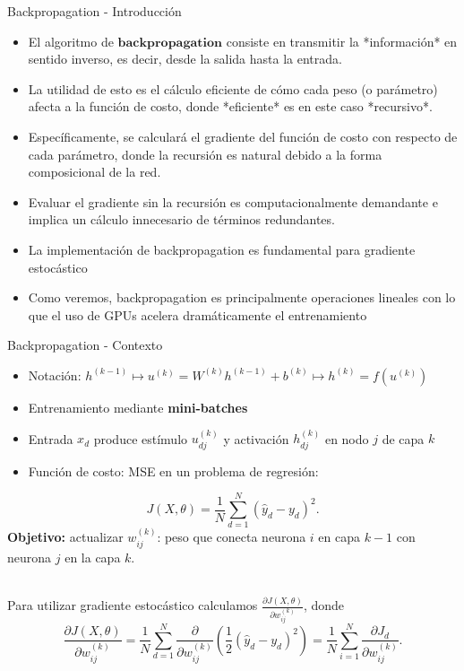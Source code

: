 \documentclass[handout, 9pt]{beamer}
\begin{document}
\begin{frame}{Backpropagation - Introducción}
\begin{itemize}
  \item El algoritmo de $\textbf{backpropagation}$ consiste en transmitir la *información* en sentido inverso, es decir, desde la salida hasta la entrada. 
  \item La utilidad de esto es el cálculo eficiente de cómo cada peso (o parámetro) afecta a la función de costo, donde *eficiente* es en este caso *recursivo*. 
  \item Específicamente, se calculará el gradiente del función de costo con respecto de cada parámetro, donde la recursión es natural debido a la forma composicional de la red. 
  \item Evaluar el gradiente sin la recursión es computacionalmente demandante e implica un cálculo innecesario de términos redundantes.
  \item La implementación de backpropagation es fundamental para gradiente estocástico
  \item Como veremos, backpropagation es principalmente operaciones lineales con lo que el uso de GPUs acelera dramáticamente el entrenamiento
\end{itemize}




\end{frame}

\begin{frame}{Backpropagation - Contexto}

\begin{itemize}
  \item Notación: $h^{(k-1)} \mapsto u^{(k)} = W^{(k)} h^{(k-1)}  + b^{(k)} \mapsto h^{(k)} = f(u^{(k)})$ \pause

  \item Entrenamiento mediante \textbf{mini-batches}
  \item Entrada $x_d$ produce estímulo $u_{dj}^{(k)}$  y activación $h_{dj}^{(k)}$  en nodo $j$ de capa $k$ \pause
 
 \item Función de costo: MSE en un problema de regresión:  \pause

\end{itemize} 
\[
J(X , \theta) = \frac{1}{N}\sum_{d=1}^N(\hat{y}_d-y_d)^2.
\]
\textbf{Objetivo:} actualizar $w_{ij}^{(k)}$: peso que conecta neurona $i$ en capa $k-1$ con neurona $j$ en la capa $k$. \\~\

Para utilizar gradiente estocástico calculamos $\frac{\partial J(X , \theta) }{\partial w_{ij}^{(k)}}$, donde \pause
\[
\frac{\partial J(X , \theta) }{\partial w_{ij}^{(k)}} = \frac{1}{N}\sum_{d=1}^N \frac{\partial}{\partial w_{ij}^{(k)}} \left ( \frac{1}{2}(\hat{y}_d-y_d)^2 \right) = \frac{1}{N}\sum_{i=1}^N \frac{\partial J_d}{\partial w_{ij}^{(k)}}.
\]
\end{frame}
\end{document}
